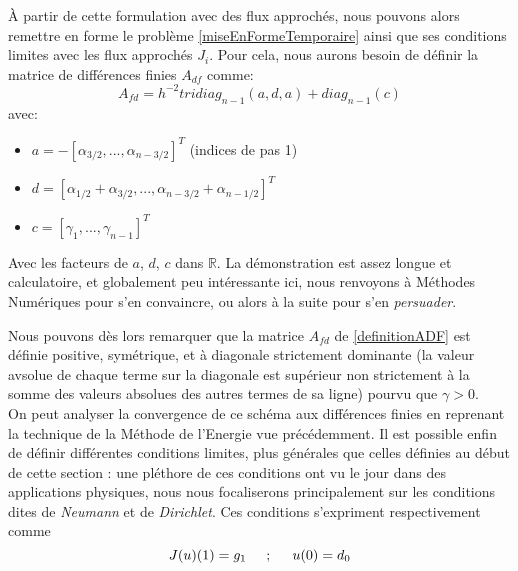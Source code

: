 \documentclass[12pt]{article}
\newcommand{\R}{\mathbb R}
\newcommand{\espace}{\hspace{5mm}}
\begin{document}
À partir de cette formulation avec des flux approchés, nous pouvons alors remettre en forme le problème \eqref{miseEnFormeTemporaire} ainsi que ses conditions limites avec les flux approchés $J_i$. Pour cela, nous aurons besoin de définir la matrice de différences finies $A_{df}$ comme:
\begin{equation} \label{definitionADF}
A_{fd} = h^{-2} tridiag_{n-1} (a,d,a) + diag_{n-1}(c)
\end{equation}
avec:
\begin{itemize}
  \item $a = -[\alpha_{3/2}, ..., \alpha_{n-3/2}]^T$ (indices de pas 1)
  \item $d = [\alpha_{1/2}+\alpha_{3/2}, ..., \alpha_{n-3/2} +\alpha_{n-1/2}]^T$
  \item $c = [\gamma_1, ..., \gamma_{n-1}]^T$
\end{itemize}
Avec les facteurs de $a$, $d$, $c$ dans $\R$. La démonstration est assez longue et calculatoire, et globalement peu intéressante ici, nous renvoyons à Méthodes Numériques pour s'en convaincre, ou alors à la suite pour s'en \emph{persuader}.

Nous pouvons dès lors remarquer que la matrice $A_{fd}$ de \eqref{definitionADF} est définie positive, symétrique, et à diagonale strictement dominante (la valeur avsolue de chaque terme sur la diagonale est supérieur non strictement à la somme des valeurs absolues des autres termes de sa ligne) pourvu que $\gamma > 0$.\\
\quad On peut analyser la convergence de ce schéma aux différences finies en reprenant la technique de la Méthode de l'Energie vue précédemment.
Il est possible enfin de définir différentes conditions limites, plus générales que celles définies au début de cette section : une pléthore de ces conditions ont vu le jour dans des applications physiques, nous nous focaliserons principalement sur les conditions dites de \emph{Neumann} et de \emph{Dirichlet}. Ces conditions s'expriment respectivement comme
\begin{equation} \label{limitesNeumannDirichlet}
J(u)(1) = g_1 \espace ; \espace u(0) = d_0
\end{equation}
\end{document}
